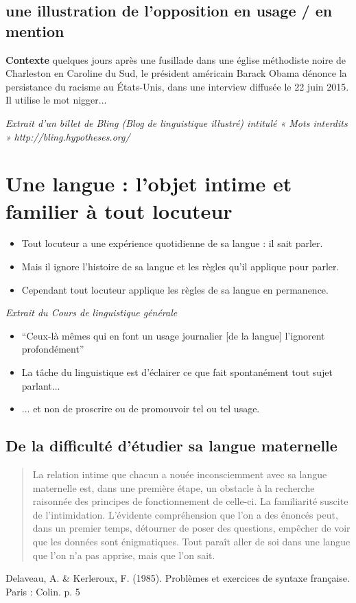 \subsection{une illustration de l'opposition en usage / en mention}
\textbf{Contexte}
quelques jours après une fusillade
dans une église méthodiste noire de
Charleston en Caroline du Sud, le
président américain Barack Obama
dénonce la persistance du racisme
au États-Unis, dans une interview
diffusée le 22 juin 2015.
Il utilise le mot nigger...

\textit{Extrait d’un billet de Bling (Blog de
linguistique illustré) intitulé « Mots
interdits »}
\textit{http://bling.hypotheses.org/}

\section{Une langue : l'objet intime et familier à tout locuteur}
\begin{itemize}
   \item Tout locuteur a une expérience quotidienne de sa langue : il sait parler.
   \item Mais il ignore l'histoire de sa langue et les règles qu'il applique pour parler.
   \item Cependant tout locuteur applique les règles de sa langue en permanence.
\end{itemize}

\emph{Extrait du \textit{Cours de linguistique générale}}
\begin{itemize}
   \item \enquote{Ceux-là mêmes qui en font un usage journalier [de la langue] l'ignorent profondément}
   \item La tâche du linguistique est d'éclairer ce que fait spontanément tout sujet parlant...
   \item ... et non de proscrire ou de promouvoir tel ou tel usage.
\end{itemize}

\subsection{De la difficulté d'étudier sa langue maternelle}
\begin{quote}
      La relation intime que chacun a nouée inconsciemment avec sa langue
maternelle est, dans une première étape, un obstacle à la recherche
raisonnée des principes de fonctionnement de celle-ci. La familiarité suscite
de l’intimidation. L’évidente compréhension que l’on a des énoncés peut,
dans un premier temps, détourner de poser des questions, empêcher de voir
que les données sont énigmatiques. Tout paraît aller de soi dans une langue
que l’on n’a pas apprise, mais que l’on sait.
\end{quote}
Delaveau, A. \& Kerleroux, F. (1985). Problèmes et exercices de syntaxe française. Paris : Colin. p. 5

